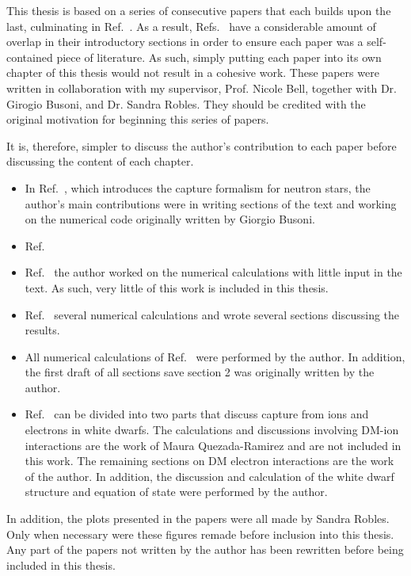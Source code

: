\begin{preface}
This thesis is based on a series of consecutive papers that each builds upon the last, culminating in Ref.~\cite{Bell:2023ysh_dec_ThermalizationAnnihilationDark}. As a result, Refs.~\cite{Bell:2020jou_sep_ImprovedTreatmentDark, Bell:2020lmm_mar_ImprovedTreatmentDark, Bell:2020obw_sep_NucleonStructureStrong, Anzuini:2021lnv_nov_Improvedtreatmentdark} have a considerable amount of overlap in their introductory sections in order to ensure each paper was a self-contained piece of literature. As such, simply putting each paper into its own chapter of this thesis would not result in a cohesive work. 
These papers were written in collaboration with my supervisor, Prof. Nicole Bell, together with Dr. Girogio Busoni, and Dr. Sandra Robles. They should be credited with the original motivation for beginning this series of papers.

It is, therefore, simpler to discuss the author's contribution to each paper before discussing the content of each chapter.

\begin{itemize}
    \item In Ref.~\cite{Bell:2020jou_sep_ImprovedTreatmentDark}, which introduces the capture formalism for neutron stars, the author's main contributions were in writing sections of the text and working on the numerical code originally written by Giorgio Busoni. 
    \item Ref.~\cite{Bell:2020lmm_mar_ImprovedTreatmentDark}
    \item Ref.~\cite{Bell:2020obw_sep_NucleonStructureStrong} the author worked on the numerical calculations with little input in the text. As such, very little of this work is included in this thesis.
    \item Ref.~\cite{Anzuini:2021lnv_nov_Improvedtreatmentdark} several numerical calculations and wrote several sections discussing the results. 
    \item All numerical calculations of Ref.~\cite{Bell:2023ysh_dec_ThermalizationAnnihilationDark} were performed by the author. In addition, the first draft of all sections save section 2 was originally written by the author.
    \item Ref.~\cite{Bell:2021fye_oct_Improvedtreatmentdark} can be divided into two parts that discuss capture from ions and electrons in white dwarfs. The calculations and discussions involving DM-ion interactions are the work of Maura Quezada-Ramirez and are not included in this work. The remaining sections on DM electron interactions are the work of the author. In addition, the discussion and calculation of the white dwarf structure and equation of state were performed by the author.
\end{itemize}
In addition, the plots presented in the papers were all made by Sandra Robles. Only when necessary were these figures remade before inclusion into this thesis.
Any part of the papers not written by the author has been rewritten before being included in this thesis. 


\end{preface}
